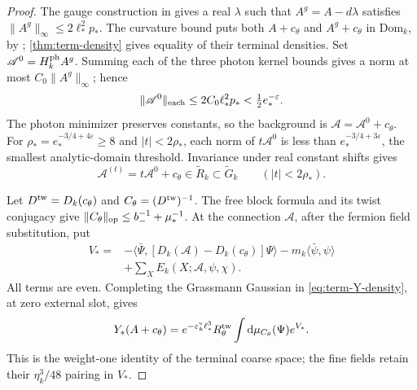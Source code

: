 \documentclass[11pt,letterpaper,reqno]{amsart}
\newcommand{\dd}{\mathrm d}
\begin{document}
\begin{proof}
The gauge construction in
\cite[(32)--(33)]{MaxwellBlock}
gives a real $\lambda$ such that
$A^g=A-d\lambda$ satisfies $\|A^g\|_\infty\le2\ell_*^2p_*$.
The curvature bound puts both $A+c_\theta$ and
$A^g+c_\theta$ in $\mathrm{Dom}_k$, by
\cite[Theorem~B]{MaxwellBlock};
\cref{thm:term-density} gives equality of their
terminal densities.
Set $\mathscr A^0=H_k^{\rm ph}A^g$.
Summing each of the three photon kernel bounds gives
a norm at most $C_0\|A^g\|_\infty$; hence
\[
 \|\mathscr A^0\|_{\rm each}
                    \le2C_0\ell_*^2p_*<\tfrac12e_*^{-\varepsilon}.
\]
The photon minimizer preserves constants, so the
background is $\mathscr A=\mathscr A^0+c_\theta$.
For $\rho_*=e_*^{-3/4+4\varepsilon}\ge8$ and
$|t|<2\rho_*$, each norm of $t\mathscr A^0$ is
less than $e_*^{-3/4+3\varepsilon}$, the smallest
analytic-domain threshold. Invariance under real
constant shifts gives
\begin{equation}\label{eq:term-terminal-disc}
 \mathscr A^{(t)}=t\mathscr A^0+c_\theta
                  \in\widetilde R_k\subset\widetilde G_k
                         \qquad(|t|<2\rho_*).
\end{equation}

Let $D^{\rm tw}=D_k(c_\theta)$ and
$C_\theta=(D^{\rm tw})^{-1}$.
The free block formula and its twist conjugacy give
$\|C_\theta\|_{\rm op}\le b_-^{-1}+\mu_*^{-1}$.
At the connection $\mathscr A$, after the fermion
field substitution, put
\begin{align}
 V_*={}&-\langle\bar\Psi,
          [D_k(\mathscr A)-D_k(c_\theta)]\Psi\rangle
               -m_k\langle\bar\psi,\psi\rangle\nonumber\\
       &+\sum_XE_k(X;\mathscr A,\psi,\chi).
                                      \label{eq:term-terminal-interaction}
\end{align}
All terms are even. Completing the Grassmann Gaussian
in \eqref{eq:term-Y-density}, at zero external slot, gives
\begin{equation}\label{eq:term-terminal-Gaussian}
 Y_*(A+c_\theta)=e^{-\varepsilon_k^{\rm v}\ell_*^3}
             R_\theta^{\rm tw}\int\dd\mu_{C_\theta}(\Psi)e^{V_*}.
\end{equation}
This is the weight-one identity of the terminal coarse
space; the fine fields retain their $\eta_k^3/48$
pairing in $V_*$.


\end{proof}
\end{document}
